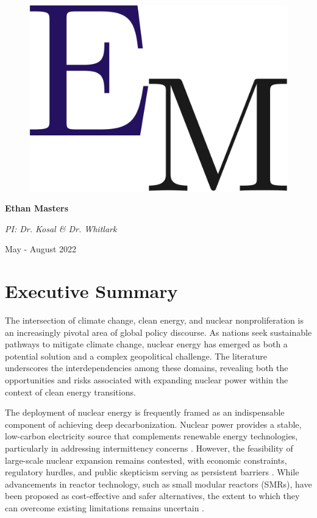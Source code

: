 \documentclass[11,5 pt]{article}
\begin{document}
\begin{titlepage}
\vspace{1.5cm}
\begin{figure}[ht!]
\centering
\includegraphics[scale=0.08]{images/Initials.png}
\end{figure}
{\bfseries\LARGE Ethan Masters \par}
\vspace{0.55cm}
{\LARGE \textit{PI: Dr. Kosal \& Dr. Whitlark}\par}
\vspace{1.2cm}

{\Large May - August 2022 \par}
\end{titlepage}

\renewcommand{\headrulewidth}{0.5pt}

\newpage

\section{Executive Summary}

The intersection of climate change, clean energy, and nuclear nonproliferation is an increasingly pivotal area of global policy discourse. As nations seek sustainable pathways to mitigate climate change, nuclear energy has emerged as both a potential solution and a complex geopolitical challenge. The literature underscores the interdependencies among these domains, revealing both the opportunities and risks associated with expanding nuclear power within the context of clean energy transitions.

The deployment of nuclear energy is frequently framed as an indispensable component of achieving deep decarbonization. Nuclear power provides a stable, low-carbon electricity source that complements renewable energy technologies, particularly in addressing intermittency concerns \cite{bunn2019nuclear}. However, the feasibility of large-scale nuclear expansion remains contested, with economic constraints, regulatory hurdles, and public skepticism serving as persistent barriers \cite{KESSIDES2012185}. While advancements in reactor technology, such as small modular reactors (SMRs), have been proposed as cost-effective and safer alternatives, the extent to which they can overcome existing limitations remains uncertain \cite{DUFFEY2005535}.
\end{document}
